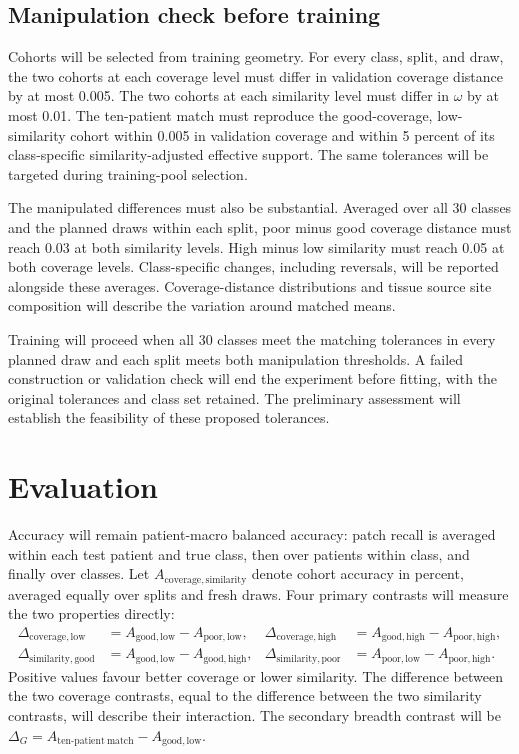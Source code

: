 \documentclass[11pt]{article}
\begin{document}
\subsection{Manipulation check before training}
\label{sec:check}
Cohorts will be selected from training geometry. For every class, split, and draw, the two cohorts at each coverage level must differ in validation coverage distance by at most 0.005. The two cohorts at each similarity level must differ in $\omega$ by at most 0.01. The ten-patient match must reproduce the good-coverage, low-similarity cohort within 0.005 in validation coverage and within 5 percent of its class-specific similarity-adjusted effective support. The same tolerances will be targeted during training-pool selection.

The manipulated differences must also be substantial. Averaged over all 30 classes and the planned draws within each split, poor minus good coverage distance must reach 0.03 at both similarity levels. High minus low similarity must reach 0.05 at both coverage levels. Class-specific changes, including reversals, will be reported alongside these averages. Coverage-distance distributions and tissue source site composition will describe the variation around matched means.

Training will proceed when all 30 classes meet the matching tolerances in every planned draw and each split meets both manipulation thresholds. A failed construction or validation check will end the experiment before fitting, with the original tolerances and class set retained. The preliminary assessment will establish the feasibility of these proposed tolerances.

\section{Evaluation}
\label{sec:evaluation}
Accuracy will remain patient-macro balanced accuracy: patch recall is averaged within each test patient and true class, then over patients within class, and finally over classes. Let $A_{\mathrm{coverage,similarity}}$ denote cohort accuracy in percent, averaged equally over splits and fresh draws. Four primary contrasts will measure the two properties directly:
\begin{align}
 \Delta_{\mathrm{coverage,low}}&=A_{\mathrm{good,low}}-A_{\mathrm{poor,low}},&
 \Delta_{\mathrm{coverage,high}}&=A_{\mathrm{good,high}}-A_{\mathrm{poor,high}},\nonumber\\
 \Delta_{\mathrm{similarity,good}}&=A_{\mathrm{good,low}}-A_{\mathrm{good,high}},&
 \Delta_{\mathrm{similarity,poor}}&=A_{\mathrm{poor,low}}-A_{\mathrm{poor,high}}.
 \label{eq:contrasts}
\end{align}
\noindent Positive values favour better coverage or lower similarity. The difference between the two coverage contrasts, equal to the difference between the two similarity contrasts, will describe their interaction. The secondary breadth contrast will be $\Delta_G=A_{\mathrm{ten\text{-}patient\ match}}-A_{\mathrm{good,low}}$.
\end{document}
